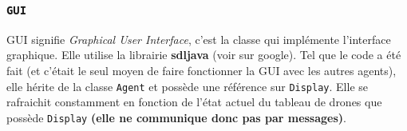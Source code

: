\documentclass[11pt]{report}
\begin{document}
\subsubsection{\protect\Verb+GUI+}

GUI signifie \textit{Graphical User Interface}, c'est la classe qui implémente l'interface graphique. Elle utilise la librairie \textbf{sdljava} (voir sur google). Tel que le code a été fait (et c'était le seul moyen de faire fonctionner la GUI avec les autres agents), elle hérite de la classe \verb|Agent| et possède une référence sur \verb|Display|. Elle se rafraichit constamment en fonction de l'état actuel du tableau de drones que possède \verb|Display| \textbf{(elle ne communique donc pas par messages)}.
\end{document}
